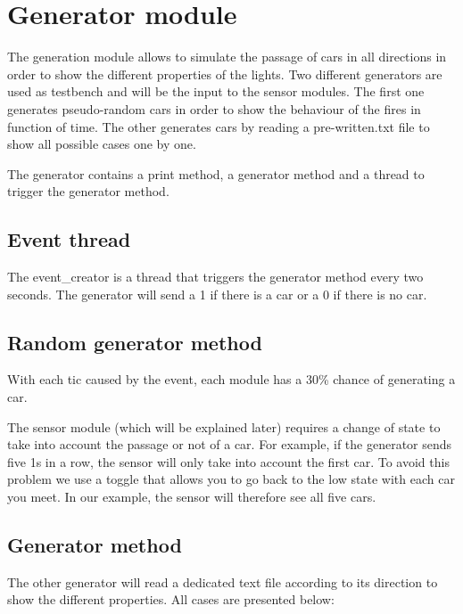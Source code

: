 \section{Generator module}

The generation module allows to simulate the passage of cars in all directions in order to show the different properties of the lights. Two different generators are used as testbench and will be the input to the sensor modules. 
The first one generates pseudo-random cars in order to show the behaviour of the fires in function of time.
The other generates cars by reading a pre-written.txt file to show all possible cases one by one. 

The generator contains a print method, a generator method and a thread to trigger the generator method.

\subsection{Event thread}

The event_creator is a thread that triggers the generator method every two seconds. The generator will send a 1 if there is a car or a 0 if there is no car.

\subsection{Random generator method}

With each tic caused by the event, each module has a 30\% chance of generating a car.

The sensor module (which will be explained later) requires a change of state to take into account the passage or not of a car. For example, if the generator sends five 1s in a row, the sensor will only take into account the first car. 
To avoid this problem we use a toggle that allows you to go back to the low state with each car you meet. In our example, the sensor will therefore see all five cars.

\subsection{Generator method}

The other generator will read a dedicated text file according to its direction to show the different properties. 
All cases are presented below: 

